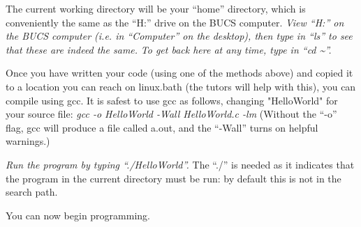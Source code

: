 \documentclass[12pt, a4paper, oneside]{article}
\begin{document}
The current working directory will be your ``home'' directory, which is conveniently the same as the ``H:'' drive on the BUCS computer.
\textit{View ``H:''  on the BUCS computer (i.e. in ``Computer'' on the desktop), then type in ``ls'' to see that these are indeed the same.}
\textit{To get back here at any time, type in ``cd \textasciitilde''.}

Once you have written your code (using one of the methods above) and copied it to a location you can reach on linux.bath (the tutors will help with this), you can compile using gcc. It is safest to use gcc as follows, changing "HelloWorld" for your source file:
\textit{gcc -o HelloWorld -Wall HelloWorld.c -lm} (Without the ``-o'' flag, gcc will produce a file called a.out, and the ``-Wall'' turns on helpful warnings.)

\textit{Run the program by typing ``./HelloWorld''.} The ``./'' is needed as it indicates that the program in the current directory must be run: by default this is not in the search path.

You can now begin programming.
\end{document}
